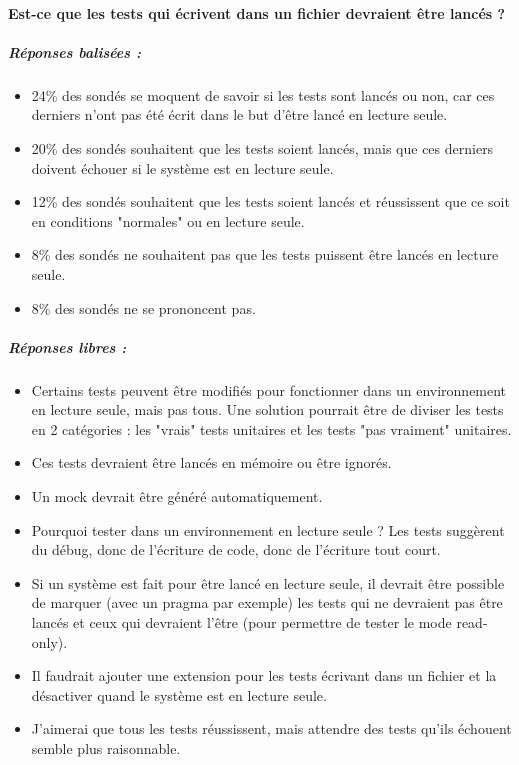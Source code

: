 \paragraph{Est-ce que les tests qui écrivent dans un fichier devraient être lancés ?}
\subparagraph{Réponses balisées :}
\begin{itemize}
	\item 24\% des sondés se moquent de savoir si les tests sont lancés ou non, car ces derniers n'ont pas été écrit dans le but d'être lancé en lecture seule.
	\item 20\% des sondés souhaitent que les tests soient lancés, mais que ces derniers doivent échouer si le système est en lecture seule.
	\item 12\% des sondés souhaitent que les tests soient lancés et réussissent que ce soit en conditions "normales" ou en lecture seule.
	\item 8\% des sondés ne souhaitent pas que les tests puissent être lancés en lecture seule.
	\item 8\% des sondés ne se prononcent pas.
\end{itemize}

\subparagraph{Réponses libres :}
\begin{itemize}
	\item Certains tests peuvent être modifiés pour fonctionner dans un environnement en lecture seule, mais pas tous. Une solution pourrait être de diviser les tests en 2 catégories : les "vrais" tests unitaires et les tests "pas vraiment" unitaires.
	\item Ces tests devraient être lancés en mémoire ou être ignorés.
	\item Un mock devrait être généré automatiquement.
	\item Pourquoi tester dans un environnement en lecture seule ? Les tests suggèrent du débug, donc de l'écriture de code, donc de l'écriture tout court.
	\item Si un système est fait pour être lancé en lecture seule, il devrait être possible de marquer (avec un pragma par exemple) les tests qui ne devraient pas être lancés et ceux qui devraient l'être (pour permettre de tester le mode read-only).
	\item Il faudrait ajouter une extension pour les tests écrivant dans un fichier et la désactiver quand le système est en lecture seule.
	\item J'aimerai que tous les tests réussissent, mais attendre des tests qu'ils échouent semble plus raisonnable.
\end{itemize}

